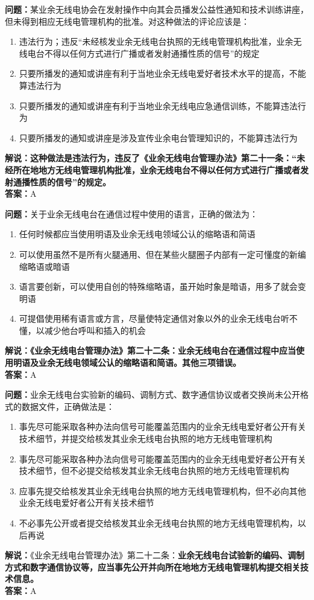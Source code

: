 \textbf{问题：}某业余无线电协会在发射操作中向其会员播发公益性通知和技术训练讲座，但未得到相应无线电管理机构的批准。对这种做法的评论应该是：
\begin{enumerate}[label=\Alph*), leftmargin=1cm]
	\item 违法行为；违反“未经核发业余无线电台执照的无线电管理机构批准，业余无线电台不得以任何方式进行广播或者发射通播性质的信号”的规定
	\item 只要所播发的通知或讲座有利于当地业余无线电爱好者技术水平的提高，不能算违法行为
	\item 只要所播发的通知或讲座有利于当地业余无线电应急通信训练，不能算违法行为
	\item 只要所播发的通知或讲座是涉及宣传业余电台管理知识的，不能算违法行为
\end{enumerate}
\textbf{解说：这种做法是违法行为，违反了《业余无线电台管理办法》第二十一条：“未经所在地地方无线电管理机构批准，业余无线电台不得以任何方式进行广播或者发射通播性质的信号”的规定。}\\\textbf{答案：}A

\textbf{问题：}关于业余无线电台在通信过程中使用的语言，正确的做法为：
\begin{enumerate}[label=\Alph*), leftmargin=1cm]
	\item 任何时候都应当使用明语及业余无线电领域公认的缩略语和简语
	\item 可以使用虽然不是所有火腿通用、但在某些火腿圈子内部有一定可懂度的新编缩略语或暗语
	\item 语言要创新，可以使用自创的特殊缩略语，虽开始时象是暗语，用多了就会变明语
	\item 可提倡使用稀有语言或方言，尽量使特定通信对象以外的业余无线电台听不懂，以减少他台呼叫和插入的机会
\end{enumerate}
\textbf{解说：《业余无线电台管理办法》第二十二条：业余无线电台在通信过程中应当使用明语及业余无线电领域公认的缩略语和简语。其他三项错误。}\\\textbf{答案：}A

\textbf{问题：}业余无线电台实验新的编码、调制方式、数字通信协议或者交换尚未公开格式的数据文件，正确做法是：
\begin{enumerate}[label=\Alph*), leftmargin=1cm]
	\item 事先尽可能采取各种办法向信号可能覆盖范围内的业余无线电爱好者公开有关技术细节，并提交给核发其业余无线电台执照的地方无线电管理机构
	\item 事先尽可能采取各种办法向信号可能覆盖范围内的业余无线电爱好者公开有关技术细节，但不必提交给核发其业余无线电台执照的地方无线电管理机构
	\item 应事先提交给核发其业余无线电台执照的地方无线电管理机构，但不必向其他业余无线电爱好者公开有关技术细节
	\item 不必事先公开或者提交给核发其业余无线电台执照的地方无线电管理机构，以后再说
\end{enumerate}
\textbf{解说：}《业余无线电台管理办法》第二十二条：\textbf{业余无线电台试验新的编码、调制方式和数字通信协议等，应当事先公开并向所在地地方无线电管理机构提交相关技术信息。}\\\textbf{答案：}A


